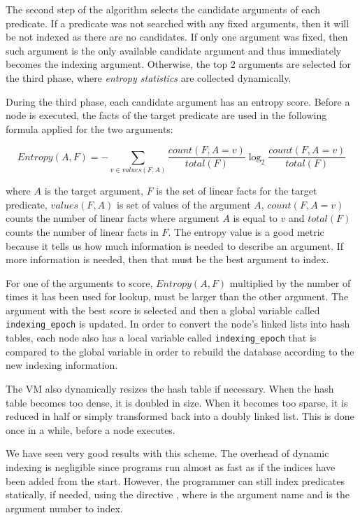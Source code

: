 The second step of the algorithm selects the candidate arguments of each
predicate. If a predicate was not searched with any fixed arguments, then it
will be not indexed as there are no candidates. If only one argument was fixed,
then such argument is the only available candidate argument and thus immediately
becomes the indexing argument. Otherwise, the top 2 arguments are selected for
the third phase, where \emph{entropy statistics} are collected dynamically.

During the third phase, each candidate argument has an entropy score. Before a
node is executed, the facts of the target predicate are used in the following
formula applied for the two arguments:

\[
Entropy(A, F) = - \sum_{v \in values(F, A)} \frac{count(F, A = v)}{total(F)} \log_2 \frac{count(F, A = v)}{total(F)}
\]

\noindent where $A$ is the target argument, $F$ is the set of linear facts for
the target predicate, $values(F, A)$ is set of values of the argument $A$,
$count(F, A = v)$ counts the number of linear facts where argument $A$ is equal
to $v$ and $total(F)$ counts the number of linear facts in $F$.  The entropy
value is a good metric because it tells us how much information is needed to
describe an argument. If more information is needed, then that must be the best
argument to index.

For one of the arguments to score, $Entropy(A, F)$ multiplied by the number of
times it has been used for lookup, must be larger than the other argument. The
argument with the best score is selected and then a global variable called
\texttt{indexing\_epoch} is updated. In order to convert the node's linked lists
into hash tables, each node also has a local variable called
\texttt{indexing\_epoch} that is compared to the global variable in order to
rebuild the database according to the new indexing information.

The VM also dynamically resizes the hash table if necessary. When the hash table
becomes too dense, it is doubled in size. When it becomes too sparse, it is
reduced in half or simply transformed back into a doubly linked list. This is
done once in a while, before a node executes.

We have seen very good results with this scheme. The overhead of dynamic
indexing is negligible since programs run almost as fast as if the indices have
been added from the start. However, the programmer can still index predicates
statically, if needed, using the directive , where
 is the argument name and  is the argument number to index.

